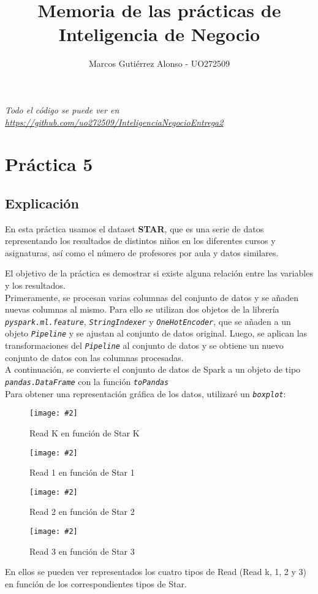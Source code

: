 \documentclass[
12pt, 
spanish, 
singlespacing,
headsepline
]{article}
\author{Marcos Gutiérrez Alonso - UO272509}
\title{Memoria de las prácticas de Inteligencia de Negocio}
\newcommand{\smallimage}[2]{
\begin{figure}[H]
	\caption{#1}
	\centering
	\texttt{[image: \#2]}
\end{figure}
}
\newcommand{\code}[1]{\textit{\texttt{#1}}}
\begin{document}
\begin{titlepage}
	\maketitle
	
\begin{center}
	\emph{Todo el código se puede ver en \href{https://github.com/uo272509/InteligenciaNegocioEntrega2}{https://github.com/uo272509/InteligenciaNegocioEntrega2}}
	
\end{center}
	\newpage
	{\hypersetup{linkcolor=black}
	\tableofcontents
	}
\end{titlepage}
\section{Práctica 5}
\subsection{Explicación}
En esta práctica usamos el dataset \textbf{STAR}, que es una serie de datos representando los resultados de distintos niños en los diferentes cursos y asignaturas, así como el número de profesores por aula y datos similares.

El objetivo de la práctica es demostrar si existe alguna relación entre las variables y los resultados.
\\

Primeramente, se procesan varias columnas del conjunto de datos y se añaden nuevas columnas al mismo. Para ello se utilizan dos objetos de la librería \code{pyspark.ml.feature}, \code{StringIndexer} y \code{OneHotEncoder}, que se añaden a un objeto \code{Pipeline} y se ajustan al conjunto de datos original. Luego, se aplican las transformaciones del \code{Pipeline} al conjunto de datos y se obtiene un nuevo conjunto de datos con las columnas procesadas.
\\

A continuación, se convierte el conjunto de datos de Spark a un objeto de tipo \code{pandas.DataFrame} con la función \code{toPandas}
\\

Para obtener una representación gráfica de los datos, utilizaré un \code{boxplot}:
\smallimage{Read K en función de Star K}{PL5.1k.png}
\smallimage{Read 1 en función de Star 1}{PL5.1-1.png}
\smallimage{Read 2 en función de Star 2}{PL5.1-2.png}
\smallimage{Read 3 en función de Star 3}{PL5.1-3.png}
En ellos se pueden ver representados los cuatro tipos de Read (Read k, 1, 2 y 3) en función de los correspondientes tipos de Star.
\end{document}
